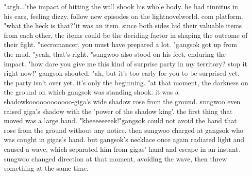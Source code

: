 "argh…"the impact of hitting the wall shook his whole body.
 he had tinnitus in his ears, feeling dizzy.
follow new episodes on the lightnov‌elworld.
c‌om platform.
"what the heck is that?"it was an item.
 since both sides hid their valuable items from each other, the items could be the deciding factor in shaping the outcome of their fight.
"necromancer, you must have prepared a lot.
"gangsok got up from the mud.
"yeah, that's right.
"sungwoo also stood on his feet, enduring the impact.
"how dare you give me this kind of surprise party in my territory? stop it right now!" gangsok shouted.
"ah, but it's too early for you to be surprised yet.
 the party isn't over yet.
 it's only the beginning.
"at that moment, the darkness on the ground on which gangsok was standing shook.
 it was a shadowkoooooooooooo-giga's wide shadow rose from the ground.
 sungwoo even raised giga's shadow with the 'power of the shadow king'.
 the first thing that moved was a large hand.
"kheeeeeeeek!"gangsok could not avoid the hand that rose from the ground without any notice.
then sungwoo charged at gangsok who was caught in gigas's hand.
 but gangsok's necklace once again radiated light and caused a wave, which separated him from gigas' hand and escape in an instant.
 sungwoo changed direction at that moment, avoiding the wave, then threw something at the same time.

